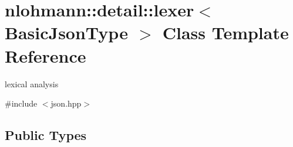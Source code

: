 \hypertarget{classnlohmann_1_1detail_1_1lexer}{}\section{nlohmann\+:\+:detail\+:\+:lexer$<$ Basic\+Json\+Type $>$ Class Template Reference}
\label{classnlohmann_1_1detail_1_1lexer}


lexical analysis  




{\ttfamily \#include $<$json.\+hpp$>$}

\subsection*{Public Types}
